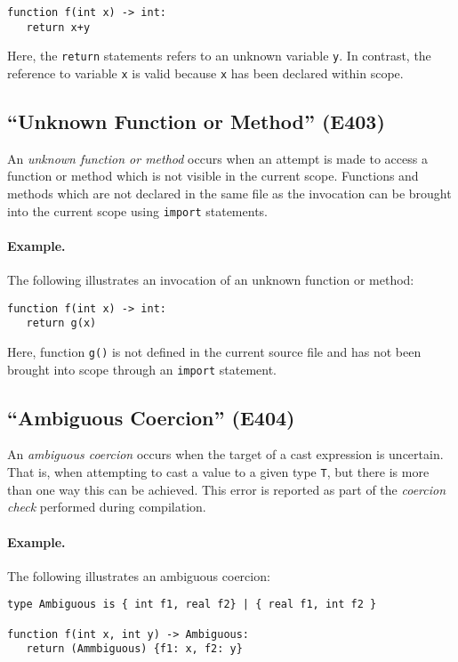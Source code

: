 \begin{lstlisting}
function f(int x) -> int:
   return x+y
\end{lstlisting}

Here, the \lstinline{return} statements refers to an unknown variable \lstinline{y}.  In contrast, the reference to variable \lstinline{x} is valid because \lstinline{x} has been declared within scope.

\subsection{``Unknown Function or Method'' (E403)}

An {\em unknown function or method} occurs when an attempt is made to access a function or method which is not visible in the current scope.  Functions and methods which are not declared in the same file as the invocation can be brought into the current scope using \lstinline{import} statements.  
\paragraph{Example.}  The following illustrates an invocation of an unknown function or method:

\begin{lstlisting}
function f(int x) -> int:
   return g(x)
\end{lstlisting}

Here, function \lstinline{g()} is not defined in the current source file and has not been brought into scope through an \lstinline{import} statement.

\subsection{``Ambiguous Coercion'' (E404)}

An {\em ambiguous coercion} occurs when the target of a cast expression is uncertain.  That is, when attempting to cast a value to a given type \lstinline{T}, but there is more than one way this can be achieved.  This error is reported as part of the {\em coercion check} performed during compilation.

\paragraph{Example.}  The following illustrates an ambiguous coercion:

\begin{lstlisting}
type Ambiguous is { int f1, real f2} | { real f1, int f2 }

function f(int x, int y) -> Ambiguous:
   return (Ammbiguous) {f1: x, f2: y}
\end{lstlisting}

